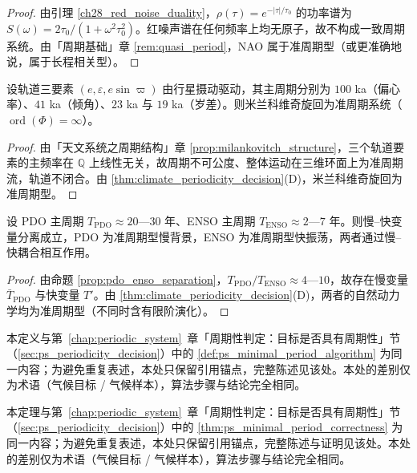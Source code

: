 \begin{proof}
由引理 \ref{ch28_red_noise_duality}，$\rho(\tau)=e^{-|\tau|/\tau_0}$ 的功率谱为 $S(\omega)=2\tau_0/(1+\omega^2\tau_0^2)$。红噪声谱在任何频率上均无原子，故不构成一致周期系统。由「周期基础」章 \cref{rem:quasi_period}，NAO 属于准周期型（或更准确地说，属于长程相关型）。
\end{proof}

\begin{lemma}[米兰科维奇旋回的准周期判定]\label{lem:milankovitch_quasiperiodic}
设轨道三要素 $(e,\varepsilon,e\sin\varpi)$ 由行星摄动驱动，其主周期分别为 $100$ ka（偏心率）、$41$ ka（倾角）、$23$ ka 与 $19$ ka（岁差）。则米兰科维奇旋回为准周期系统（$\operatorname{ord}(\Phi)=\infty$）。
\end{lemma}

\begin{proof}
由「天文系统之周期结构」章 \cref{prop:milankovitch_structure}，三个轨道要素的主频率在 $\mathbb{Q}$ 上线性无关，故周期不可公度、整体运动在三维环面上为准周期流，轨道不闭合。由 \cref{thm:climate_periodicity_decision}(D)，米兰科维奇旋回为准周期型。
\end{proof}

\begin{lemma}\label{lem:pdo_enso_separation_decision}
设 PDO 主周期 $T_{\text{PDO}}\approx20$—$30$ 年、ENSO 主周期 $T_{\text{ENSO}}\approx2$—$7$ 年。则慢–快变量分离成立，PDO 为准周期型慢背景，ENSO 为准周期型快振荡，两者通过慢–快耦合相互作用。
\end{lemma}

\begin{proof}
由命题 \ref{prop:pdo_enso_separation}，$T_{\text{PDO}}/T_{\text{ENSO}}\approx4$—$10$，故存在慢变量 $\bar T_{\text{PDO}}$ 与快变量 $T'$。由 \cref{thm:climate_periodicity_decision}(D)，两者的自然动力学均为准周期型（不同时含有限阶演化）。
\end{proof}

\begin{definition}[气候最小正周期算法]\label{def:climate_minimal_period_algorithm}
本定义与第~\ref{chap:periodic_system}~章「周期性判定：目标是否具有周期性」节（\cref{sec:ps_periodicity_decision}）中的 \cref{def:ps_minimal_period_algorithm} 为同一内容；为避免重复表述，本处只保留引用锚点，完整陈述见该处。本处的差别仅为术语（气候目标 / 气候样本），算法步骤与结论完全相同。
\end{definition}

\begin{theorem}[气候最小正周期算法的正确性]\label{thm:climate_minimal_period_correctness}
本定理与第~\ref{chap:periodic_system}~章「周期性判定：目标是否具有周期性」节（\cref{sec:ps_periodicity_decision}）中的 \cref{thm:ps_minimal_period_correctness} 为同一内容；为避免重复表述，本处只保留引用锚点，完整陈述与证明见该处。本处的差别仅为术语（气候目标 / 气候样本），算法步骤与结论完全相同。
\end{theorem}

